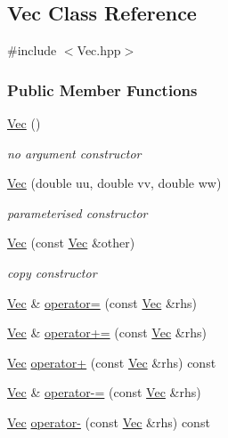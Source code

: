 \hypertarget{classVec}{\subsection{\-Vec \-Class \-Reference}
\label{classVec}
}


{\ttfamily \#include $<$\-Vec.\-hpp$>$}

\subsubsection*{\-Public \-Member \-Functions}
\begin{DoxyCompactItemize}
\item 
\hyperlink{classVec_aefd6dd5ca241f55cdc5548e4c02dc187}{\-Vec} ()
\begin{DoxyCompactList}\small\item\em no argument constructor \end{DoxyCompactList}\item 
\hyperlink{classVec_a857ab87f43484ae8581f021bc2dea0eb}{\-Vec} (double uu, double vv, double ww)
\begin{DoxyCompactList}\small\item\em parameterised constructor \end{DoxyCompactList}\item 
\hyperlink{classVec_ac252c18437696a2fda6b7427116741a9}{\-Vec} (const \hyperlink{classVec}{\-Vec} \&other)
\begin{DoxyCompactList}\small\item\em copy constructor \end{DoxyCompactList}\item 
\hyperlink{classVec}{\-Vec} \& \hyperlink{classVec_a2432e72a4c830d7ae40d36fe843f8fa0}{operator=} (const \hyperlink{classVec}{\-Vec} \&rhs)
\item 
\hyperlink{classVec}{\-Vec} \& \hyperlink{classVec_aa5147cd7b8bbfde4d9cfe50c5ef06d0e}{operator+=} (const \hyperlink{classVec}{\-Vec} \&rhs)
\item 
\hyperlink{classVec}{\-Vec} \hyperlink{classVec_a5f46f2a53419e8c985511601643f87ad}{operator+} (const \hyperlink{classVec}{\-Vec} \&rhs) const 
\item 
\hyperlink{classVec}{\-Vec} \& \hyperlink{classVec_adce31c56c9f71357dfea84f44e461d0c}{operator-\/=} (const \hyperlink{classVec}{\-Vec} \&rhs)
\item 
\hyperlink{classVec}{\-Vec} \hyperlink{classVec_ae7a06f3161cbc8921dace94a0ecb0bfb}{operator-\/} (const \hyperlink{classVec}{\-Vec} \&rhs) const 

\end{DoxyCompactItemize}
